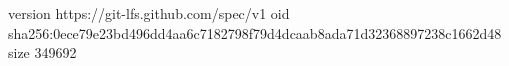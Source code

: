 version https://git-lfs.github.com/spec/v1
oid sha256:0ece79e23bd496dd4aa6c7182798f79d4dcaab8ada71d32368897238c1662d48
size 349692
